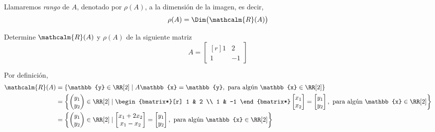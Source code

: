 \begin{definicion}{}{}
    Llamaremos \emph{rango} de $A$, denotado por $\rho(A)$, a la dimensión de la imagen, es decir,
    $$\rho(A) = \Dim\big(\mathcalm{R}(A)\big)$$
\end{definicion}

\begin{examplebox}{}{}
    Determine $\mathcalm{R}(A)$ y $\rho(A)$ de la siguiente matriz
    $$A = \begin{bmatrix*}[r]
        1 & 2 \\
        1 & -1
    \end{bmatrix*}$$

    \tcblower
    \solucion Por definición,
    \begin{align*}
        \mathcalm{R}(A) & = \left\{ \mathbb{y} \in \RR[2] \mid A\mathbb{x} = \mathbb{y}, \text{ para algún } \mathbb{x} \in \RR[2] \right\} \\
        & = \left\{ \begin{pmatrix}
            y_1 \\
            y_2
        \end{pmatrix} \in \RR[2] \mid \begin{bmatrix*}[r]
            1 & 2 \\
            1 & -1
        \end{bmatrix*} \begin{bmatrix}
            x_1 \\
            x_2
        \end{bmatrix} = \begin{bmatrix}
            y_1 \\
            y_2
        \end{bmatrix}, \text{ para algún } \mathbb{x} \in \RR[2] \right\} \\
        & = \left\{ \begin{pmatrix}
            y_1 \\
            y_2
        \end{pmatrix} \in \RR[2] \mid \begin{bmatrix}
            x_1 + 2x_2 \\
            x_1 - x_2
        \end{bmatrix} = \begin{bmatrix}
            y_1 \\
            y_2
        \end{bmatrix}, \text{ para algún } \mathbb{x} \in \RR[2] \right\} \\

\end{align*}
\end{examplebox}
